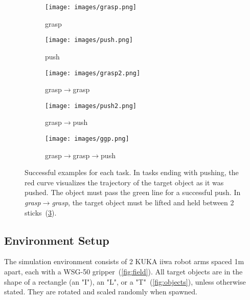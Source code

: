 \documentclass[10pt,twocolumn,letterpaper]{article}
\begin{document}
\begin{figure}[t]
  \centering
  \begin{subfigure}{0.4\linewidth}
    \texttt{[image: images/grasp.png]}
    \caption{grasp}
    \label{fig:g-s}
  \end{subfigure}
  \begin{subfigure}{0.4\linewidth}
    \texttt{[image: images/push.png]}
    \caption{push}
    \label{fig:p-s}
  \end{subfigure}
  \begin{subfigure}{0.4\linewidth}
     \texttt{[image: images/grasp2.png]}
     \caption{grasp$\rightarrow$grasp}
    \label{fig:gg-s}
  \end{subfigure}
  \begin{subfigure}{0.4\linewidth}
    \texttt{[image: images/push2.png]}
    \caption{grasp$\rightarrow$push}
    \label{fig:gp-s}
  \end{subfigure}
  
  \begin{subfigure}{0.4\linewidth}
    \texttt{[image: images/ggp.png]}
    \caption{grasp$\rightarrow$grasp$\rightarrow$push}
    \label{fig:ggp-s}
  \end{subfigure}
  
  \caption{Successful examples for each task. In tasks ending with pushing, the red curve visualizes the trajectory of the target object as it was pushed. The object must pass the green line for a successful push. In \emph{grasp$\rightarrow$grasp}, the target object must be lifted and held between 2 sticks~(\cref{fig:gg-s}).}
  \label{fig:success}
\end{figure}


\subsection{Environment Setup}


The simulation environment consists of 2 KUKA iiwa robot arms spaced 1m apart, each with a WSG-50 gripper~(\cref{fig:field}). All target objects are in the shape of a rectangle (an "I"), an "L", or a "T"~(\cref{fig:objects}), unless otherwise stated. They are rotated and scaled randomly when spawned.
\end{document}
